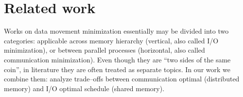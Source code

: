 \documentclass[sigplan,review,anonymous,10pt]{acmart}\settopmatter{printfolios=true,printccs=false,printacmref=false}
\begin{document}

\section{Related work}

Works on data movement minimization essentially may be divided into two 
categories: applicable across 
memory hierarchy (vertical, also called I/O minimization), or between parallel 
processes (horizontal, also called communication minimization). Even though 
they are ``two sides of the same coin'', in literature they are often treated 
as 
separate topics. In our work we combine them: analyze
trade--offs between 
communication optimal (distributed memory) and I/O optimal schedule 
(shared memory).
\end{document}
